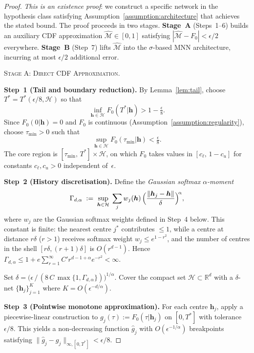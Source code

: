 \documentclass[12pt]{article}
\theoremstyle{remark}
\begin{document}
\begin{proof}
\emph{This is an existence proof}: we construct a specific network in the
hypothesis class satisfying Assumption~\ref{assumption:architecture} that
achieves the stated bound. The proof proceeds in two stages.
\textbf{Stage~A} (Steps~1--6) builds an auxiliary CDF approximation
$\hat{\mathcal{M}} \in [0,1]$ satisfying
$|\hat{\mathcal{M}} - F_0| < \epsilon/2$ everywhere.
\textbf{Stage~B} (Step~7) lifts $\hat{\mathcal{M}}$ into the
$\sigma$-based MNN architecture, incurring at most $\epsilon/2$ additional error.

\medskip\noindent\textsc{Stage A: Direct CDF Approximation.}

\textbf{Step~1 (Tail and boundary reduction).}
By Lemma~\ref{lem:tail}, choose $T^* = T^*(\epsilon/8,\mathcal{H})$ so that
\[
  \inf_{\boldsymbol{h}\in\mathcal{H}} F_0(T^*|\boldsymbol{h}) > 1 - \tfrac{\epsilon}{8}.
\]
Since $F_0(0|\boldsymbol{h}) = 0$ and $F_0$ is continuous (Assumption~\ref{assumption:regularity}),
choose $\tau_{\min} > 0$ such that
\[
  \sup_{\boldsymbol{h}\in\mathcal{H}} F_0(\tau_{\min}|\boldsymbol{h}) < \tfrac{\epsilon}{8}.
\]
The core region is $[\tau_{\min},\,T^*] \times \mathcal{H}$,
on which $F_0$ takes values in $[c_{\ell},\, 1-c_u]$ for constants
$c_{\ell}, c_u > 0$ independent of~$\epsilon$.

\textbf{Step~2 (History discretisation).}
Define the \emph{Gaussian softmax $\alpha$-moment}
\[
  \Gamma_{d,\alpha}
  \;:=\;
  \sup_{\boldsymbol{h}\in\mathcal{H}}\;
  \sum_{j} w_j(\boldsymbol{h})\,
  \Bigl(\frac{\|\boldsymbol{h}_j - \boldsymbol{h}\|}{\delta}\Bigr)^{\!\alpha},
\]
where $w_j$ are the Gaussian softmax weights defined in Step~4 below.
This constant is finite: the nearest centre $j^*$ contributes $\le 1$,
while a centre at distance $r\delta$ ($r>1$) receives softmax weight
$w_j \le e^{1-r^2}$,
and the number of centres in the shell $[r\delta,(r\!+\!1)\delta]$
is $O(r^{d-1})$.
Hence
$\Gamma_{d,\alpha}
  \le 1 + e\!\sum_{r=1}^{\infty} C' r^{d-1+\alpha} e^{-r^2} < \infty$.

Set
$\delta = \bigl(\epsilon\,/\,(8\,C\,\max\{1,\Gamma_{d,\alpha}\})\bigr)^{1/\alpha}$.
Cover the compact set $\mathcal{H}\subset\mathbb{R}^d$ with a $\delta$-net
$\{\boldsymbol{h}_j\}_{j=1}^K$ where
$K = O(\epsilon^{-d/\alpha})$.

\textbf{Step~3 (Pointwise monotone approximation).}
For each centre $\boldsymbol{h}_j$, apply a piecewise-linear construction to
$g_j(\tau) := F_0(\tau|\boldsymbol{h}_j)$ on $[0,T^*]$ with tolerance $\epsilon/8$.
This yields a non-decreasing function
$\hat{g}_j$ with $O(\epsilon^{-1/\alpha})$ breakpoints satisfying
$\|\hat{g}_j - g_j\|_{\infty,[0,T^*]} < \epsilon/8$.


\end{proof}
\end{document}
